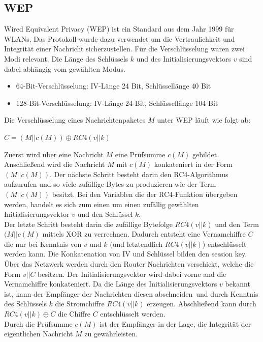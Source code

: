 \documentclass[10pt,a4paper]{article}
\begin{document}
\subsection{WEP}\label{ssec:wep}
Wired Equivalent Privacy (WEP) ist ein Standard aus dem Jahr 1999 für WLANs. Das Protokoll wurde dazu verwendet um die Vertraulichkeit und Integrität einer Nachricht sicherzustellen. Für die Verschlüsselung waren zwei Modi relevant. Die Länge des Schlüssels $k$ und des Initialisierungsvektors $v$ sind dabei abhängig vom gewählten Modus.
\begin{itemize}
\item 64-Bit-Verschlüsselung: IV-Länge 24 Bit, Schlüssellänge 40 Bit
\item 128-Bit-Verschlüsselung: IV-Länge 24 Bit, Schlüssellänge 104 Bit
\end{itemize}
Die Verschlüsselung eines Nachrichtenpaketes $M$ unter WEP läuft wie folgt ab:\vspace{0.5em}
\begin{center}
$C = (M || c(M)) \oplus RC4(v || k)$
\end{center}
Zuerst wird über eine Nachricht $M$ eine Prüfsumme $c(M)$ gebildet. Anschließend wird die Nachricht $M$ mit $c(M)$ konkateniert in der Form $(M || c(M))$. Der nächste Schritt besteht darin den RC4-Algorithmus aufzurufen und so viele zufällige Bytes zu produzieren wie der Term $(M || c(M))$ besitzt. Bei den Variablen die der RC4-Funktion übergeben werden, handelt es sich zum einen um einen zufällig gewählten Initialisierungsvektor $v$ und den Schlüssel $k$.\\
Der letzte Schritt besteht darin die zufällige Bytefolge $RC4(v || k)$ und den Term $(M || c(M)$ mittels XOR zu verrechnen. Dadurch entsteht eine Vernamchiffre $C$ die nur bei Kenntnis von $v$ und $k$ (und letztendlich $RC4(v || k)$) entschlüsselt werden kann. Die Konkatenation von IV und Schlüssel bilden den \glqq session key\grqq .\\
Über das Netzwerk werden durch den Router Nachrichten verschickt, welche die Form $v || C$ besitzen. Der Initialisierungsvektor wird dabei vorne and die Vernamchiffre konkateniert. Da die Länge des Initialisierungsvektors $v$ bekannt ist, kann der Empfänger der Nachrichten diesen \glqq abschneiden\grqq\ und durch Kenntnis des Schlüssels $k$ die Stromchiffre $RC4(v || k)$ erzeugen. Abschließend kann durch $RC4(v || k) \oplus C$ die Chiffre $C$ entschlüsselt werden.\\
Durch die Prüfsumme $c(M)$ ist der Empfänger in der Lage, die Integrität der eigentlichen Nachricht $M$ zu gewährleisten. 
\end{document}
